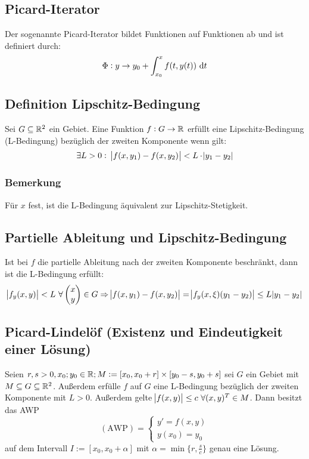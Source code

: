 \subsection{Picard-Iterator}
Der sogenannte Picard-Iterator bildet Funktionen auf Funktionen ab und ist definiert durch:
\begin{equation*}
	\Phi: y \rightarrow y_0 + \int_{x_0}^x f(t, y(t)) \text{ d}t
\end{equation*}

\subsection{Definition Lipschitz-Bedingung}
Sei $G \subseteq \mathbb{R}^2$ ein Gebiet. Eine Funktion $f: G \rightarrow \mathbb{R}$ erfüllt eine Lipschitz-Bedingung
(L-Bedingung) bezüglich der zweiten Komponente wenn gilt:
\begin{equation*}
	\exists L > 0:\ \abs{f(x,y_1) - f(x, y_2)} < L \cdot \abs{y_1 - y_2}
\end{equation*}

\subsubsection{Bemerkung}
Für $x$ fest, ist die L-Bedingung äquivalent zur Lipschitz-Stetigkeit.

\subsection{Partielle Ableitung und Lipschitz-Bedingung}
Ist bei $f$ die partielle Ableitung nach der zweiten Komponente beschränkt, dann ist die L-Bedingung erfüllt:
\begin{equation*}
	\abs{f_y(x,y)} < L\ \forall
	\begin{pmatrix}
		x \\ y
	\end{pmatrix} \in G \Rightarrow \abs{f(x, y_1) - f(x,y_2)} = \abs{f_y(x, \xi)(y_1-y_2)} \leq L \abs{y_1 - y_2}
\end{equation*}

\subsection{Picard-Lindelöf (Existenz und Eindeutigkeit einer Lösung)}
Seien $r, s > 0, x_0; y_0 \in \mathbb{R}; M := [x_0, x_0 + r] \times [y_0-s, y_0+s]$ sei $G$ ein Gebiet mit
$M \subseteq G \subseteq \mathbb{R}^2$. Außerdem erfülle $f$ auf $G$ eine L-Bedingung bezüglich der zweiten 
Komponente mit $L>0$. Außerdem gelte $\abs{f(x,y)} \leq c \ \forall (x,y)^T \in M$. Dann besitzt das AWP
\begin{equation*}
	(\text{AWP}) = \begin{cases}
		y' = f(x,y) \\ y(x_0) = y_0
	\end{cases}
\end{equation*}
auf dem Intervall $I := [x_0, x_0 + \alpha]$ mit $\alpha = \min \{r, \frac{s}{c} \}$ genau eine Lösung.

